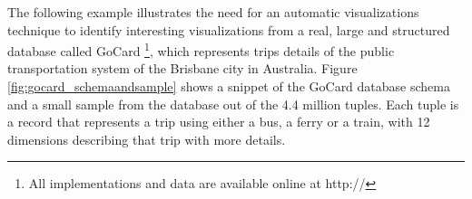 The following example illustrates the need for an automatic visualizations technique to identify interesting visualizations from a real, large and structured database called GoCard \footnote{All implementations and data are available online at http://}, which represents trips details of the public transportation system of the Brisbane city in Australia.
%
Figure \ref{fig:gocard_schemaandsample} shows a snippet of the GoCard database schema and a small sample from the database out of the 4.4 million tuples.
%
Each tuple is a record that represents a trip using either a bus, a ferry or a train, with 12 dimensions describing that trip with more details.
%
%
%
%
%
%
%
%
